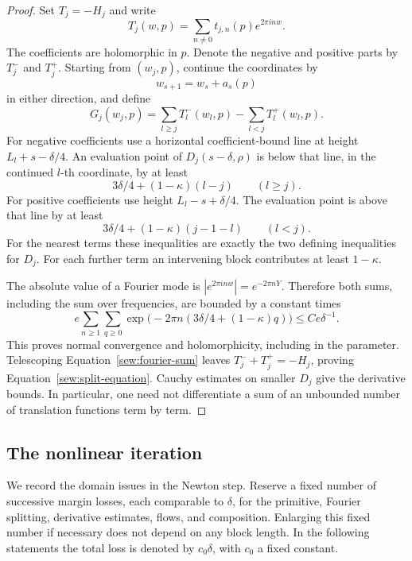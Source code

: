 \begin{proof}
Set $T_j=-H_j$ and write
\[
             T_j(w,p)=\sum_{n\neq0}t_{j,n}(p)e^{2\pi i n w}.
\]
The coefficients are holomorphic in $p$.  Denote the negative and
positive parts by $T_j^-$ and $T_j^+$.  Starting from $(w_j,p)$,
continue the coordinates by
\[
                          w_{s+1}=w_s+a_s(p)
\]
in either direction, and define
\begin{equation}\label{sew:fourier-sum}
 G_j(w_j,p)=\sum_{l\geq j}T_l^-(w_l,p)
                         -\sum_{l<j}T_l^+(w_l,p).
\end{equation}
For negative coefficients use a horizontal coefficient-bound line
at height $L_l+s-\delta/4$.  An evaluation point of
$D_j(s-\delta,\rho)$ is below that line, in the continued $l$-th
coordinate, by at least
\[
                     3\delta/4+(1-\kappa)(l-j)
                     \qquad(l\geq j).
\]
For positive coefficients use height $L_l-s+\delta/4$.  The
evaluation point is above that line by at least
\[
                     3\delta/4+(1-\kappa)(j-1-l)
                     \qquad(l<j).
\]
For the nearest terms these inequalities are exactly the two defining
inequalities for $D_j$.  For each further term an intervening block
contributes at least $1-\kappa$.

The absolute value of a Fourier mode is
$|e^{2\pi i n w}|=e^{-2\pi nY}$.  Therefore both sums, including the
sum over frequencies, are bounded by a constant times
\[
 e\sum_{n\geq1}\sum_{q\geq0}
       \exp\bigl(-2\pi n(3\delta/4+(1-\kappa)q)\bigr)
 \leq C e\delta^{-1}.
\]
This proves normal convergence and holomorphicity, including in the
parameter.  Telescoping Equation~\eqref{sew:fourier-sum} leaves
$T_j^-+T_j^+=-H_j$, proving
Equation~\eqref{sew:split-equation}.  Cauchy estimates on smaller
$D_j$ give the derivative bounds.  In particular, one need not
differentiate a sum of an unbounded number of translation functions
term by term.
\end{proof}

\subsection{The nonlinear iteration}

We record the domain issues in the Newton step.  Reserve a fixed
number of successive margin losses, each comparable to $\delta$,
for the primitive, Fourier splitting, derivative estimates, flows,
and composition.  Enlarging this fixed number if necessary does not
depend on any block length.  In the following statements the total
loss is denoted by $c_0\delta$, with $c_0$ a fixed constant.


